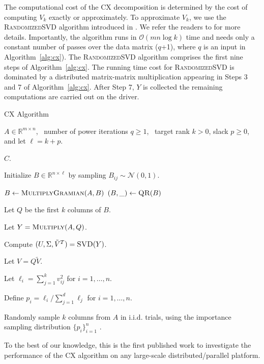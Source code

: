 The computational cost of the CX decomposition is determined by the cost of computing $V_k$ exactly or approximately. To approximate $V_k$, we use the \textsc{RandomizedSVD} algorithm introduced in \cite{MRT06,MRT11}. We refer the readers to \cite{HMT09_SIREV,Mah-mat-rev_BOOK} for more details. Importantly, the algorithm runs in $\mathcal{O}(mn \log k)$ time and needs only a constant number of passes over the data matrix ($q$+1), where $q$ is an input in Algorithm~\ref{alg:cx}).  The \textsc{RandomizedSVD} algorithm comprises the first nine steps of Algorithm~\ref{alg:cx}. The running time cost for \textsc{RandomizedSVD} is dominated by a distributed matrix-matrix multiplication appearing in Steps 3 and 7 of Algorithm~\ref{alg:cx}. After Step 7, $Y$ is collected the remaining computations are carried out on the driver.

\begin{algorithm}[tb]
   \caption{{\sc CX} Algorithm}
    \label{alg:cx}
    \begin{algorithmic}[1]
      \Require $A \in \mathbb{R}^{m\times n}$, \
        number of power iterations $q \ge 1$, \
        target rank $k > 0$, slack $p \ge 0$, and let $\ell=k+p$.

      \Ensure $C$.

      \State Initialize $B \in \mathbb{R}^{n\times \ell}$ by sampling $B_{ij} \sim \mathcal{N}(0, 1)$.

      \For{$q$ times}
          \State $B \gets \Call{MultiplyGramian}{A, B}$
          \State $(B, \_) \gets \Call{QR}{B}$
      \EndFor

      \State Let $Q$ be the first $k$ columns of $B$.

      \State Let $Y = \Call{Multiply}{A, Q}$.

      \State Compute $(U, \Sigma, \tilde V^T) = \Call{SVD}{Y}$.

      \State Let $V = Q \tilde V$.

	  \State Let $\ell_i = \sum_{j=1}^k v_{ij}^2$ for $i = 1, \ldots, n$.
      
      \State Define $p_i = \ell_i / \sum_{j=1}^d \ell_j$ for $i=1,\ldots,n$.
      
      \State Randomly sample $k$ columns from $A$ in i.i.d. trials, using the importance sampling distribution $\{p_i\}_{i=1}^n$ .
      \end{algorithmic}
  \end{algorithm}
To the best of our knowledge, this is the first published work to investigate the performance of the CX algorithm on any large-scale distributed/parallel platform.
